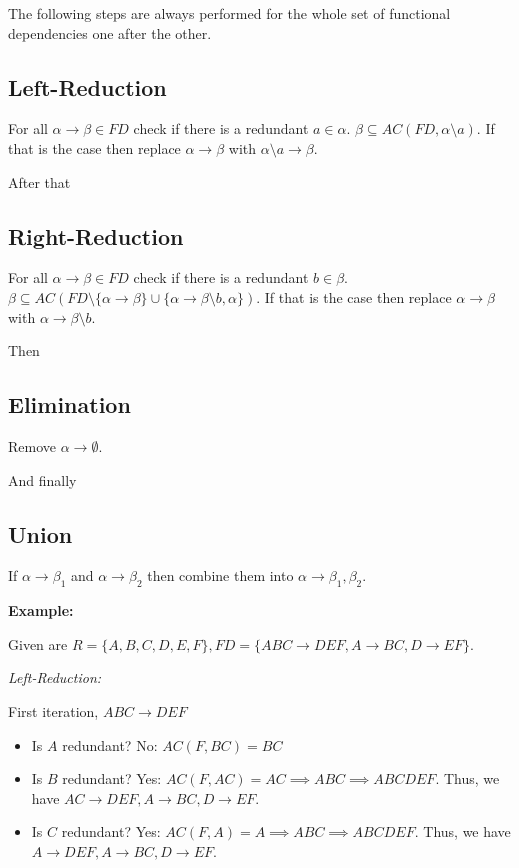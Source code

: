 The following steps are always performed for the whole set of functional dependencies one after the other.

\subsection{Left-Reduction}

For all \(\alpha \to \beta \in FD\) check if there is a redundant \(a \in \alpha\). \(\beta \subseteq AC(FD, \alpha \setminus a)\).
If that is the case then replace \(\alpha \to \beta\) with \(\alpha \setminus a \to \beta\).

After that 

\subsection{Right-Reduction}

For all \(\alpha \to \beta \in FD\) check if there is a redundant \(b \in \beta\). 
\(\beta \subseteq AC(FD \setminus \{\alpha \to \beta \} \cup \{\alpha \to \beta \setminus b, \alpha\})\).
If that is the case then replace \(\alpha \to \beta\) with \(\alpha \to \beta \setminus b\).

Then 

\subsection{Elimination}

Remove \(\alpha \to \emptyset\).

And finally

\subsection{Union}

If \(\alpha \to \beta_1\) and \(\alpha \to \beta_2\) then combine them into \(\alpha \to \beta_1, \beta_2\).

\textbf{Example:}

Given are \(R=\{ A, B, C, D, E, F \}, FD=\{ ABC \to DEF,A \to BC,D \to EF\} \).

\emph{Left-Reduction:}

First iteration, \(ABC \to DEF\)

\begin{itemize}
    
    \item Is \(A\) redundant? No: \(AC(F, BC) = BC\)
    
    \item Is \(B\) redundant? Yes: \(AC(F, AC) = AC \implies ABC \implies ABCDEF\).  
    Thus, we have \(AC \to DEF, A \to BC, D \to EF\).
    
    \item Is \(C\) redundant? Yes: \(AC(F, A) = A \implies ABC \implies ABCDEF\).  
    Thus, we have \(A \to DEF, A \to BC, D \to EF\).

\end{itemize}

